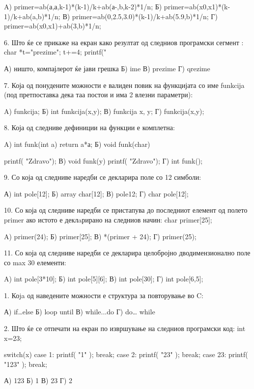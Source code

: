 {{{{           A) primer=ab(а,а,k-1)*(k-1)/k+ab(а-,b,k-2)*1/n;
           Б) primer=ab(x0,x1)*(k-1)/k+ab(a,b)*1/n;
В) primer=ab(0,2.5,3.0)*(k-1)/k+ab(5.9,b)*1/n; 
Г) primer=ab(x0,x1)+ab(3,b)*1/n;


6. Што ќе се прикаже на екран како резултат од следниов програмски сегмент :       char *t="prezime"; t+=4;     printf("%

А) ништо, компајлерот ќе јави грешка    Б) ime
В) prezime                  Г) qrezime

7. Која од понудените можности е валиден повик на функцијата со име funkcija (под претпоставка дека таа постои и има 2 влезни параметри):

A) funkcija;                    Б) int funkcija(x,y);
В) funkcija x, y;               Г) funkcija(x,y);

8. Која од следниве дефиниции на функции е комплетна:

A) int funk(int a) {return a*а;}        
Б) void funk(char) { printf( "Zdravo");
В) void funk(y) { printf( "Zdravo"); } 
Г) int funk();

9. Со која од следниве наредби се декларира поле со 12 симболи:

А) int pole[12];                    Б) array char[12];
В) pole{12};                                                Г) char pole[12];

10. Со која од следниве наредби се пристапува до последниот елемент од полето primer ако истото е деклaрирано на следниов начин: char primer[25];

A) primer(24);                  Б) primer[25];
В) *(primer + 24);              Г) primer(25);

11. Со која од следниве наредби се декларира целобројно дводимензионално поле  со max 30 елементи:

A) int pole[3*10];          Б) int pole[5][6];
В) int pole[30];            Г) int pole[6,5];

1. Коja од наведените можности е структура за повторување во C:

А) if…else                  Б) loop until
В) while...do               Г) do… while

2. Што ќе се отпечати на екран по извршување на следниов програмски код:
int x=23;

switch(x)
{
  case 1: printf( "1" ); break;
  case 2: printf( "23" ); break;
  case 23: printf( "123" ); break;
}

А) 123                  Б) 1
В) 23                   Г) 2   


}}}}}
